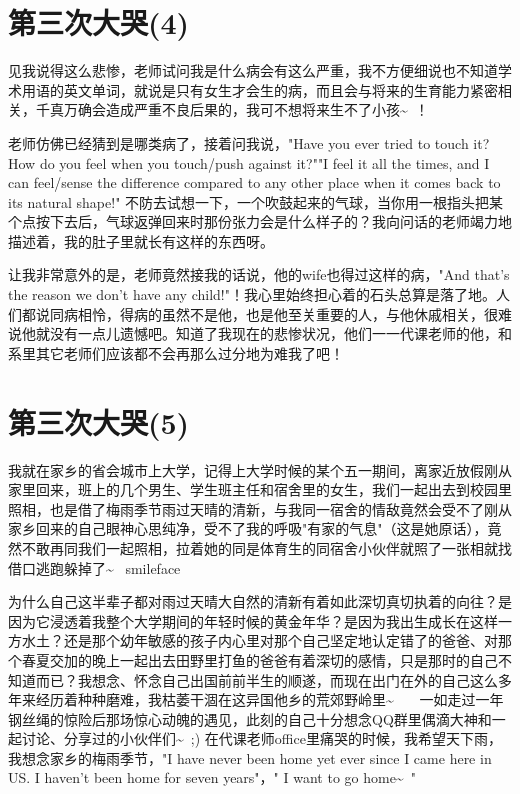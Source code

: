 \documentclass[12pt]{book}
\begin{document}
\section{第三次大哭(4)}
\label{sec-43-4}

见我说得这么悲惨，老师试问我是什么病会有这么严重，我不方便细说也不知道学术用语的英文单词，就说是只有女生才会生的病，而且会与将来的生育能力紧密相关，千真万确会造成严重不良后果的，我可不想将来生不了小孩\textasciitilde{}~！

老师仿佛已经猜到是哪类病了，接着问我说，"Have you ever tried to touch it? How do you feel when you touch/push against it?""I feel it all the times, and I can feel/sense the difference compared to any other place when it comes back to its natural shape!" 不防去试想一下，一个吹鼓起来的气球，当你用一根指头把某个点按下去后，气球返弹回来时那份张力会是什么样子的？我向问话的老师竭力地描述着，我的肚子里就长有这样的东西呀。

让我非常意外的是，老师竟然接我的话说，他的wife也得过这样的病，"And that's the reason we don't have any child!"！我心里始终担心着的石头总算是落了地。人们都说同病相怜，得病的虽然不是他，也是他至关重要的人，与他休戚相关，很难说他就没有一点儿遗憾吧。知道了我现在的悲惨状况，他们一一代课老师的他，和系里其它老师们应该都不会再那么过分地为难我了吧！

\section{第三次大哭(5)}
\label{sec-43-5}

我就在家乡的省会城市上大学，记得上大学时候的某个五一期间，离家近放假刚从家里回来，班上的几个男生、学生班主任和宿舍里的女生，我们一起出去到校园里照相，也是借了梅雨季节雨过天晴的清新，与我同一宿舍的情敌竟然会受不了刚从家乡回来的自己眼神心思纯净，受不了我的呼吸"有家的气息"（这是她原话），竟然不敢再同我们一起照相，拉着她的同是体育生的同宿舍小伙伴就照了一张相就找借口逃跑躲掉了\textasciitilde{}~  smileface

为什么自己这半辈子都对雨过天晴大自然的清新有着如此深切真切执着的向往？是因为它浸透着我整个大学期间的年轻时候的黄金年华？是因为我出生成长在这样一方水土？还是那个幼年敏感的孩子内心里对那个自己坚定地认定错了的爸爸、对那个春夏交加的晚上一起出去田野里打鱼的爸爸有着深切的感情，只是那时的自己不知道而已？我想念、怀念自己出国前前半生的顺遂，而现在出门在外的自己这么多年来经历着种种磨难，我枯萎干涸在这异国他乡的荒郊野岭里\textasciitilde{}~　 一如走过一年钢丝绳的惊险后那场惊心动魄的遇见，此刻的自己十分想念QQ群里偶滴大神和一起讨论、分享过的小伙伴们\textasciitilde{}~;)  在代课老师office里痛哭的时候，我希望天下雨，我想念家乡的梅雨季节，"I have never been home yet ever since I came here in US. I haven't been home for seven years"，" I want to go home\textasciitilde{}~"
\end{document}
